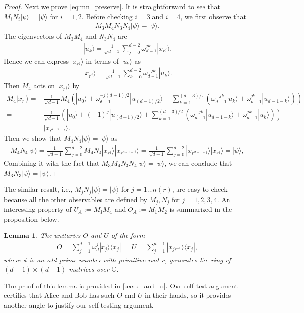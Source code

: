 \documentclass[11pt,letterpaper]{article}
\newcommand{\ket}[1]{|#1\rangle}
\newcommand{\ketbra}[2]{|#1\rangle\langle#2|}
\newcommand{\C}{\mathbb{C}}
\newcommand{\1}{\mathbb{1}}
\newcommand{\nr}{n(r)}
\newtheorem{lemma}[theorem]{Lemma}
\theoremstyle{definition}
\begin{document}
\begin{proof}
	Next we prove \cref{eq:mn_preserve}. It is straightforward to see that $M_iN_i \ket{\psi} = \ket{\psi}$ for $i = 1,2$.
	Before checking $i=3$ and $i=4$, we first observe that
	\begin{align*}
		M_3M_4 N_3 N_4 \ket{\psi} = \ket{\psi}.
	\end{align*}
	The eigenvectors of $M_3M_4$ and $N_3N_4$ are 
        \begin{align*}
        		\ket{u_k} = \frac{1}{\sqrt{d-1}} \sum_{j=0}^{d-2} \omega_{d-1}^{jk} \ket{x_{r^j}}.
        \end{align*}
        Hence we can express $\ket{x_{r^j}}$ in terms of $\ket{u_k}$ as 
        \begin{align*}
        		\ket{x_{r^j}} = \frac{1}{\sqrt{d-1}} \sum_{k=0}^{d-2} \omega_{d-1}^{-jk} \ket{u_k}.
        \end{align*}
        Then $M_4$ acts on $\ket{x_{r^j}}$ by
        \begin{align*}
        		M_4 \ket{x_{r^j}} =& \frac{1}{\sqrt{d-1}} M_4\left(\ket{u_0} + \omega_{d-1}^{-j(d-1)/2}\ket{u_{(d-1)/2}}  + 
        	\sum_{k=1}^{(d-3)/2} (\omega_{d-1}^{-jk} \ket{u_k} + \omega_{d-1}^{jk} \ket{u_{d-1-k}})\right) \\
        	=&\frac{1}{\sqrt{d-1}} \left(\ket{u_0} + (-1)^j\ket{u_{(d-1)/2}}  + 
        	\sum_{k=1}^{(d-3)/2} (\omega_{d-1}^{-jk} \ket{u_{d-1-k}} + \omega_{d-1}^{jk} \ket{u_{k}})\right) \\
        	=& \ket{x_{r^{d-1-j}}}.
        \end{align*}
        Then we show that $M_4  N_4 \ket{\psi} = \ket{\psi}$ as 
        \begin{align*}
        	M_4 N_4 \ket{\psi} = \frac{1}{\sqrt{d-1}}  \sum_{j=0}^{d-2} M_4  N_4 \ket{x_{r^j}} \ket{x_{r^{d-1-j}}} 
        	= \frac{1}{\sqrt{d-1}} \sum_{j=0}^{d-2} \ket{x_{r^{d-1-j}}} \ket{x_{r^{j}}} =\ket{\psi},
        \end{align*}
	Combining it with the fact that $M_3M_4 N_3N_4 \ket{\psi} = \ket{\psi}$, we can conclude that
	$M_3N_3 \ket{\psi} = \ket{\psi}$.
\end{proof}
The similar result, i.e., $M_jN_j \ket{\psi} = \ket{\psi}$ for $j = 1 \dots \nr$, are easy to check because all the other observables are defined by $M_j, N_j$ for $j=1,2,3,4$.
An interesting property of $U_A := M_3M_4$ and $O_A := M_1M_2$ is summarized in the proposition below. 
\begin{lemma}
	\label{lm:uo_independ}
	The unitaries $O$ and $U$ of the form
	\begin{align}
		O = \sum_{j=1}^{d-1} \omega_d^j \ketbra{x_j}{x_j} && U = \sum_{j=1}^{d-1}\ketbra{x_{j r^{-1}}}{x_j},
	\end{align}
	where $d$ is an odd prime number with primitive root $r$, generates
	the ring of $(d-1)\times (d-1)$ matrices over $\C$.
\end{lemma}
The proof of this lemma is provided in \cref{sec:u_and_o}.
Our self-test argument certifies that Alice and Bob has such $O$ and $U$ in their hands, so
it provides another angle to justify our self-testing argument.
\end{document}
